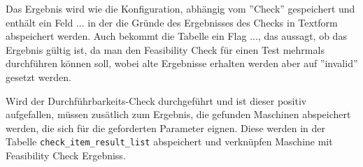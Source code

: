 Das Ergebnis wird wie die Konfiguration, abhängig vom ''Check'' gespeichert und enthält ein Feld ... in der die Gründe des Ergebnisses des Checks in Textform abspeichert werden. Auch bekommt die Tabelle ein Flag ..., das aussagt, ob das Ergebnis gültig ist, da man den Feasibility Check für einen Test mehrmals durchführen können soll, wobei alte Ergebnisse erhalten werden aber auf ''invalid'' gesetzt werden.

Wird der Durchführbarkeits-Check durchgeführt und ist dieser positiv aufgefallen, müssen zusätlich zum Ergebnis, die gefunden Maschinen abspeichert werden, die sich für die geforderten Parameter eignen. Diese werden in der Tabelle \texttt{check\_item\_result\_list} abspeichert und verknüpfen Maschine mit Feasibility Check Ergebniss.

